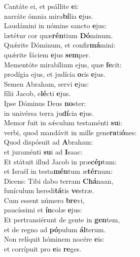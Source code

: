 \evenverse Cantáte ei, et psállite \textbf{e}i:~\*\\
\evenverse narráte ómnia mira\textbf{bí}lia \textbf{e}jus.\\
\oddverse Laudámini in nómine sancto \textbf{e}jus:~\*\\
\oddverse lætétur cor quæ\textbf{rén}tium \textbf{Dó}minum.\\
\evenverse Quǽrite Dóminum, et confir\textbf{má}mini:~\*\\
\evenverse quǽrite fáciem \textbf{e}jus \textbf{sem}per.\\
\oddverse Mementóte mirabílium ejus, quæ \textbf{fe}cit:~\*\\
\oddverse prodígia ejus, et judícia \textbf{o}ris \textbf{e}jus.\\
\evenverse Semen Abraham, servi \textbf{e}jus:~\*\\
\evenverse fílii Jacob, e\textbf{lé}cti \textbf{e}jus.\\
\oddverse Ipse Dóminus Deus \textbf{no}ster:~\*\\
\oddverse in univérsa terra ju\textbf{dí}cia \textbf{e}jus.\\
\evenverse Memor fuit in sǽculum testaménti \textbf{su}i:~\*\\
\evenverse verbi, quod mandávit in mille gene\textbf{ra}ti\textbf{ó}nes:\\
\oddverse Quod dispósuit ad \textbf{A}braham:~\*\\
\oddverse et juraménti \textbf{su}i ad \textbf{I}saac:\\
\evenverse Et státuit illud Jacob in præ\textbf{cép}tum:~\*\\
\evenverse et Israël in testa\textbf{mén}tum æ\textbf{tér}num:\\
\oddverse Dicens: Tibi dabo terram \textbf{Chá}naan,~\*\\
\oddverse funículum heredi\textbf{tá}tis \textbf{ve}stræ.\\
\evenverse Cum essent número \textbf{bre}vi,~\*\\
\evenverse paucíssimi et \textbf{ín}colæ \textbf{e}jus:\\
\oddverse Et pertransiérunt de gente in \textbf{gen}tem,~\*\\
\oddverse et de regno ad \textbf{pó}pulum \textbf{ál}terum.\\
\evenverse Non relíquit hóminem nocére \textbf{e}is:~\*\\
\evenverse et corrípuit pro \textbf{e}is \textbf{re}ges.\\
